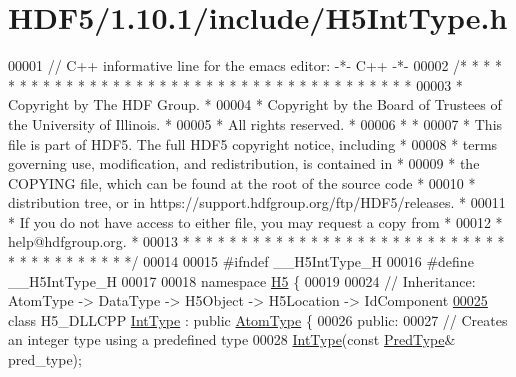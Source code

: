 \hypertarget{_h_d_f5_21_810_81_2include_2_h5_int_type_8h_source}{}\section{H\+D\+F5/1.10.1/include/\+H5\+Int\+Type.h}
\label{_h_d_f5_21_810_81_2include_2_h5_int_type_8h_source}

\begin{DoxyCode}
00001 \textcolor{comment}{// C++ informative line for the emacs editor: -*- C++ -*-}
00002 \textcolor{comment}{/* * * * * * * * * * * * * * * * * * * * * * * * * * * * * * * * * * * * * * *}
00003 \textcolor{comment}{ * Copyright by The HDF Group.                                               *}
00004 \textcolor{comment}{ * Copyright by the Board of Trustees of the University of Illinois.         *}
00005 \textcolor{comment}{ * All rights reserved.                                                      *}
00006 \textcolor{comment}{ *                                                                           *}
00007 \textcolor{comment}{ * This file is part of HDF5.  The full HDF5 copyright notice, including     *}
00008 \textcolor{comment}{ * terms governing use, modification, and redistribution, is contained in    *}
00009 \textcolor{comment}{ * the COPYING file, which can be found at the root of the source code       *}
00010 \textcolor{comment}{ * distribution tree, or in https://support.hdfgroup.org/ftp/HDF5/releases.  *}
00011 \textcolor{comment}{ * If you do not have access to either file, you may request a copy from     *}
00012 \textcolor{comment}{ * help@hdfgroup.org.                                                        *}
00013 \textcolor{comment}{ * * * * * * * * * * * * * * * * * * * * * * * * * * * * * * * * * * * * * * */}
00014 
00015 \textcolor{preprocessor}{#ifndef \_\_H5IntType\_H}
00016 \textcolor{preprocessor}{#define \_\_H5IntType\_H}
00017 
00018 \textcolor{keyword}{namespace }\hyperlink{namespace_h5}{H5} \{
00019 
00024 \textcolor{comment}{//  Inheritance: AtomType -> DataType -> H5Object -> H5Location -> IdComponent}
\hyperlink{class_h5_1_1_int_type}{00025} \textcolor{keyword}{class }H5\_DLLCPP \hyperlink{class_h5_1_1_int_type}{IntType} : \textcolor{keyword}{public} \hyperlink{class_h5_1_1_atom_type}{AtomType} \{
00026    \textcolor{keyword}{public}:
00027         \textcolor{comment}{// Creates an integer type using a predefined type}
00028         \hyperlink{class_h5_1_1_int_type}{IntType}(\textcolor{keyword}{const} \hyperlink{class_h5_1_1_pred_type}{PredType}& pred\_type);

\end{DoxyCode}
